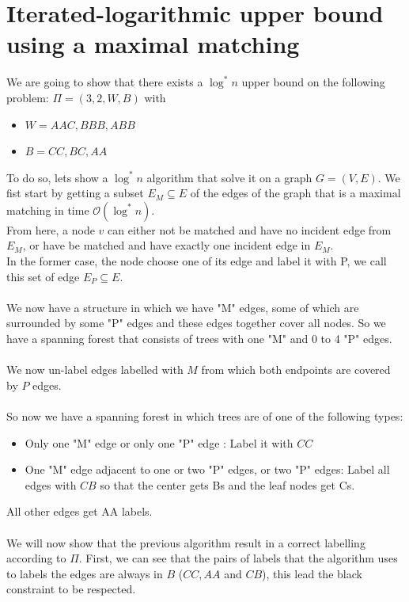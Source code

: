 \section{Iterated-logarithmic upper bound using a maximal matching}
We are going to show that there exists a $\log^*n$ upper bound on the following problem:
$\Pi = (3,2,W,B)$
with
\begin{itemize}
    \item $W = AAC, BBB, ABB$
    \item $B = CC, BC, AA$
\end{itemize}
To do so, lets show a $\log^*n$ algorithm that solve it on a graph $G=(V,E)$.
We fist start by getting a subset $E_M\subseteq E$ of the edges of the graph that is a maximal matching in time $\mathcal{O}(\log^*n)$.\\
From here, a node $v$ can either not be matched and have no incident edge from $E_M$, or have be matched and have exactly one incident edge in $E_M$.\\
In the former case, the node choose one of its edge and label it with P, we call this set of edge $E_P\subseteq E$.\\\\
We now have a structure in which we have "M" edges, some of which are surrounded by some "P" edges and these edges together cover all nodes. So we have a spanning forest that consists of trees with one "M" and 0 to 4 "P" edges.\\\\
We now un-label edges labelled with $M$ from which both endpoints are covered by $P$ edges.\\\\
So now we have a spanning forest in which trees are of one of the following types:
\begin{itemize}
    \item Only one "M" edge or only one "P" edge : Label it with $CC$
    \item One "M" edge adjacent to one or two "P" edges, or two "P" edges: Label all edges with $CB$ so that the center gets Bs and the leaf nodes get Cs.
\end{itemize}
All other edges get AA labels.\\\\
We will now show that the previous algorithm result in a correct labelling according to $\Pi$.
First, we can see that the pairs of labels that the algorithm uses to labels the edges are always in $B$ ($CC,AA$ and $CB$), this lead the black constraint to be respected.\\\\

